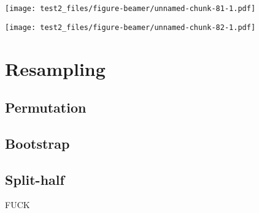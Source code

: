 \documentclass[
  ignorenonframetext,
]{beamer}
\begin{document}
\begin{frame}

\texttt{[image: test2\_files/figure-beamer/unnamed-chunk-81-1.pdf]}

\end{frame}

\begin{frame}

\texttt{[image: test2\_files/figure-beamer/unnamed-chunk-82-1.pdf]}

\end{frame}

\hypertarget{resampling}{%
\section{Resampling}\label{resampling}}

\hypertarget{permutation}{%
\subsection{Permutation}\label{permutation}}

\hypertarget{bootstrap}{%
\subsection{Bootstrap}\label{bootstrap}}

\hypertarget{split-half}{%
\subsection{Split-half}\label{split-half}}

\begin{frame}{FUCK}
\protect\hypertarget{fuck}{}

\end{frame}
\end{document}
